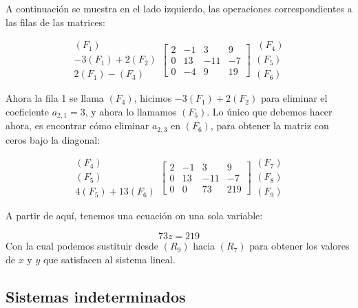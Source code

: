 \documentclass[
]{book}
\begin{document}
A continuación se muestra en el lado izquierdo, las operaciones correspondientes a las filas de las matrices:

\begin{equation}
\begin{array}{r}
(F_1) \\ -3(F_1)+2(F_2) \\ 2(F_1)-(F_3)
\end{array}
\left[
\begin{array}{rrr|r}
2 &-1 & 3 & 9 \\
0 &13 &-11&-7 \\
0 &-4 & 9 &19
\end{array}
\right]
\begin{array}{r}
\ (F_4) \\ (F_5) \\ (F_6)
\end{array}
\end{equation}

Ahora la fila 1 se llama \((F_4)\), hicimos \(-3(F_1)+2(F_2)\) para eliminar el coeficiente \(a_{2,1} = 3\), y ahora lo llamamos \((F_5)\). Lo único que debemos hacer ahora, es encontrar cómo eliminar \(a_{2,3}\) en \((F_6)\), para obtener la matriz con ceros bajo la diagonal:

\begin{equation}
\begin{array}{r}
(F_4) \\ (F_5) \\ 4(F_5)+13(F_6)
\end{array}
\left[
\begin{array}{rrr|r}
2 &-1 & 3 & 9 \\
0 &13 &-11&-7 \\
0 & 0 &73 &219
\end{array}
\right]
\begin{array}{r}
(F_7) \\ (F_8) \\ (F_9)
\end{array}
\end{equation}

A partir de aquí, tenemos una ecuación on una sola variable:

\[73z = 219\]
Con la cual podemos sustituir desde \((R_9)\) hacia \((R_7)\) para obtener los valores de \(x\) y \(y\) que satisfacen al sistema lineal.

\hypertarget{sistemas-indeterminados}{%
\subsection{Sistemas indeterminados}\label{sistemas-indeterminados}}
\end{document}
